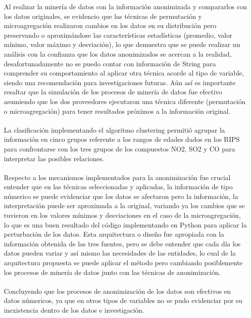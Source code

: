 \documentclass[a4paper,openright,12pt]{book}
\theoremstyle{definition}
\theoremstyle{remark}
\begin{document}
Al realizar la minería de datos con la información anonimizada y compararlos con los datos originales, se evidencio que las técnicas de permutación y microagregación realizaron cambios en los datos en su distribución pero preservando o aproximándose las características estadísticas (promedio, valor mínimo, valor máximo y desviación), lo que demuestra que se puede realizar un análisis con la confianza que los datos anonimizados se acercan a la realidad, desafortunadamente no se puedo contar con información de String para comprender su comportamiento al aplicar otra técnica acorde al tipo de variable, siendo una recomendación para investigaciones futuras. Aún así es importante resaltar que la simulación de los procesos de minería de datos fue efectivo asumiendo que los dos proveedores ejecutaron una técnica diferente (permutación o microagregación) para tener resultados próximos a la información original.\\\\  La clasificación implementando el algoritmo clustering permitió agrupar la información en cinco grupos referente a los rangos de edades dados en los RIPS para confrontarse con los tres grupos de los compuestos NO2, SO2 y CO para interpretar las posibles relaciones.\\\\Respecto a los mecanismos implementados para la anonimización fue crucial entender que en las técnicas seleccionadas y aplicadas, la información de tipo númerico se puede evidenciar que los datos se afectaron pero la información, la interpretación puede ser aproximada a la original, variando ya los cambios que se tuvieron en los valores mínimos y desviaciones en el caso de la microagregación, lo que es una buen resultado del código implementando en Python para aplicar la perturbación de los datos. Esta arquitectura o diseño fue apropiada con la información obtenida de las tres fuentes, pero se debe entender que cada día los datos pueden variar y así mismo las necesidades de las entidades,  lo cual de la arquitectura propuesta se puede aplicar el método pero cambiando posiblemente los procesos de minería de datos junto con las técnicas de anonimización.\\\\Concluyendo que los procesos de anonimización de los datos son efectivos en datos númericos, ya que en otros tipos de variables no se pudo evidenciar por su inexistencia dentro de los datos e investigación.
\end{document}
